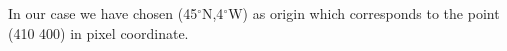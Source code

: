 
In our case we have chosen (45$^\circ$N,4$^\circ$W) as origin which corresponds to the point (410 400) in pixel coordinate.

